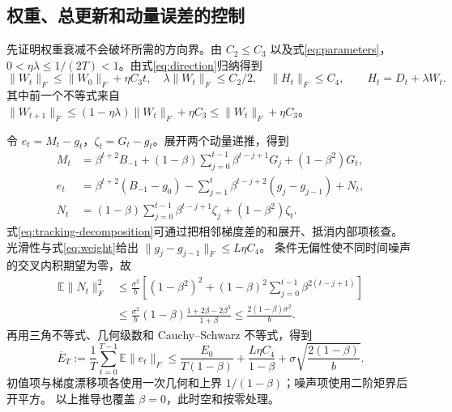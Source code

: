 \subsection{权重、总更新和动量误差的控制}
先证明权重衰减不会破坏所需的方向界。由 $C_2\le C_3$ 以及式\eqref{eq:parameters}，
$0<\eta\lambda\le1/(2T)<1$。由式\eqref{eq:direction}归纳得到
\begin{equation}\label{eq:weight}
 \|W_t\|_F\le\|W_0\|_F+\eta C_3t,\quad
 \lambda\|W_t\|_F\le C_2/2,\quad
 \|H_t\|_F\le C_4,\qquad H_t=D_t+\lambda W_t.
\end{equation}
其中前一个不等式来自
$\|W_{t+1}\|_F\le(1-\eta\lambda)\|W_t\|_F+\eta C_3\le\|W_t\|_F+\eta C_3$。

令 $e_t=M_t-g_t$，$\zeta_t=G_t-g_t$。展开两个动量递推，得到
\begin{align}
 M_t&=\beta^{t+2}B_{-1}
 +(1-\beta)\sum_{j=0}^{t-1}\beta^{t-j+1}G_j+(1-\beta^2)G_t,\\
 e_t&=\beta^{t+2}(B_{-1}-g_0)
 -\sum_{j=1}^{t}\beta^{t-j+2}(g_j-g_{j-1})+N_t,\label{eq:tracking-decomposition}\\
 N_t&=(1-\beta)\sum_{j=0}^{t-1}\beta^{t-j+1}\zeta_j+(1-\beta^2)\zeta_t.
\end{align}
式\eqref{eq:tracking-decomposition}可通过把相邻梯度差的和展开、抵消内部项核查。
光滑性与式\eqref{eq:weight}给出
$\|g_j-g_{j-1}\|_F\le L\eta C_4$。
条件无偏性使不同时间噪声的交叉内积期望为零，故
\begin{align}
 \mathbb E\|N_t\|_F^2
 &\le\frac{\sigma^2}{b}\left[(1-\beta^2)^2
 +(1-\beta)^2\sum_{j=0}^{t-1}\beta^{2(t-j+1)}\right]\\
 &\le\frac{\sigma^2}{b}(1-\beta)\frac{1+2\beta-2\beta^3}{1+\beta}
 \le\frac{2(1-\beta)\sigma^2}{b}.
\end{align}
再用三角不等式、几何级数和 Cauchy--Schwarz 不等式，得到
\begin{equation}\label{eq:tracking-bound}
 \overline E_T:=\frac1T\sum_{t=0}^{T-1}\mathbb E\|e_t\|_F
 \le\frac{E_0}{T(1-\beta)}
 +\frac{L\eta C_4}{1-\beta}
 +\sigma\sqrt{\frac{2(1-\beta)}{b}}.
\end{equation}
初值项与梯度漂移项各使用一次几何和上界 $1/(1-\beta)$；噪声项使用二阶矩界后开平方。
以上推导也覆盖 $\beta=0$，此时空和按零处理。

